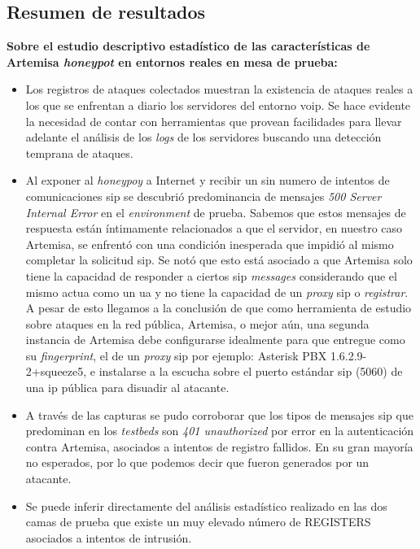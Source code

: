 \documentclass[a4paper,12pt]{report}
\begin{document}
{\newpage

\subsection{Resumen de resultados}

\textbf{Sobre el estudio descriptivo estadístico de las características de Artemisa
\emph{honeypot} en entornos reales en mesa de prueba:}

\begin{itemize}
\item{Los registros de ataques colectados muestran la existencia de ataques
reales a los que se enfrentan a diario los servidores del entorno \ac{voip}. Se hace
evidente la necesidad de contar con herramientas que provean facilidades para
llevar adelante el análisis de los \emph{logs} de los servidores buscando una detección
temprana de ataques.}

\item{Al exponer al \emph{honeypoy} a Internet y recibir un sin numero de
intentos de comunicaciones \ac{sip} se descubrió predominancia de mensajes 
\emph{500 Server Internal Error} en el \emph{\mbox{environment}}
de prueba. Sabemos que estos mensajes de respuesta están íntimamente relacionados a que el
servidor, en nuestro caso Artemisa, se enfrentó con una 
condición inesperada que impidió al mismo completar la solicitud \ac{sip}. Se notó que esto 
está asociado a que Artemisa solo tiene la capacidad de responder
a ciertos \ac{sip} \emph{messages} considerando que el mismo actua como un \ac{ua} y no tiene la
capacidad de un \emph{proxy} \ac{sip} o \emph{registrar}. A pesar de esto llegamos a la conclusión
de que como herramienta de estudio sobre ataques en la red pública,  Artemisa, o mejor aún, una 
segunda instancia de Artemisa
debe configurarse idealmente para que entregue como su \emph{fingerprint},
el de un \emph{proxy} \ac{sip} por ejemplo: Asterisk PBX 1.6.2.9-2+squeeze5,
e instalarse a la escucha sobre el puerto estándar \ac{sip} (5060) de una \ac{ip} pública para
disuadir al atacante.}

\item{A través de las capturas se pudo corroborar que los tipos de mensajes \ac{sip} que predominan
en los \emph{testbeds} son \emph{401 unauthorized} por error en la autenticación contra Artemisa, 
asociados a intentos de registro fallidos. En su gran mayoría no esperados, por lo que podemos decir 
que fueron generados por un atacante.}

\item{Se puede inferir directamente del análisis estadístico realizado en las dos camas de prueba
que existe un muy elevado número de REGISTERS asociados a intentos de intrusión.}


\end{itemize}}
\end{document}
